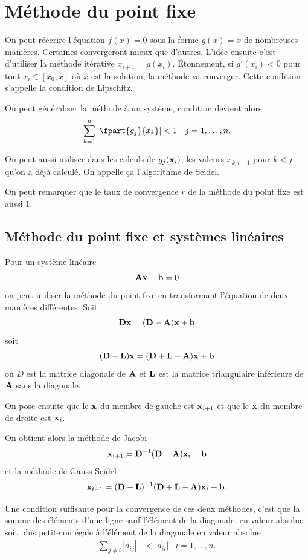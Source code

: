 \section{Méthode du point fixe}
On peut réécrire l'équation $f(x) = 0$ sous la forme $g(x) = x$ de nombreuses
manières.
Certaines convergeront mieux que d'autres.
L'idée ensuite c'est d'utiliser la méthode itérative $x_{i+1} = g(x_i)$.
Étonnement, si $g'(x_i) < 0$ pour tout $x_i \in [x_0; x]$
où $x$ est la solution, la méthode va converger.
Cette condition s'appelle la condition de Lipschitz.

On peut généraliser la méthode à un système,
condition devient alors
\begin{align*}
  \sum_{k=1}^n\left|\fpart{g_j}{x_k}\right| & < 1 & j = 1,\ldots,n.
\end{align*}

On peut aussi utiliser dans les calculs de $g_j({\bf x}_i)$,
les valeurs $x_{k,i+1}$ pour $k < j$ qu'on a déjà calculé.
On appelle ça l'algorithme de Seidel.

On peut remarquer que le taux de convergence $r$ de la méthode du
point fixe est aussi 1.

\subsection{Méthode du point fixe et systèmes linéaires}
Pour un système linéaire
\[ {\bf A}{\bf x} - {\bf b} = 0 \]
on peut utiliser la méthode du point fixe en transformant l'équation
de deux manières différentes.
Soit
\[ {\bf D}{\bf x} = ({\bf D} - {\bf A}){\bf x} + {\bf b} \]
soit
\[ ({\bf D} + {\bf L}){\bf x} = ({\bf D} + {\bf L} - {\bf A}){\bf x} + {\bf b} \]
où $D$ est la matrice diagonale de ${\bf A}$ et ${\bf L}$ est
la matrice triangulaire inférieure de ${\bf A}$ sans la diagonale.

On pose ensuite que le ${\bf x}$ du membre de gauche est ${\bf x}_{i+1}$
et que le ${\bf x}$ du membre de droite est ${\bf x}_i$.

On obtient alors la méthode de Jacobi
\[ {\bf x}_{i+1} = {\bf D}^{-1}({\bf D} - {\bf A}){\bf x}_i + {\bf b} \]
et la méthode de Gauss-Seidel
\[ {\bf x}_{i+1} = ({\bf D} + {\bf L})^{-1}
({\bf D} + {\bf L} - {\bf A}){\bf x}_i + {\bf b}. \]

Une condition suffisante pour la convergence de ces deux méthodes,
c'est que la somme des éléments d'une ligne sauf l'élément de la diagonale,
en valeur absolue soit plus petite ou égale à l'élément de la diagonale
en valeur absolue
\begin{align*}
  \sum_{j \neq i}|a_{ij}| & < |a_{ii}| & i = 1, \ldots, n.
\end{align*}

